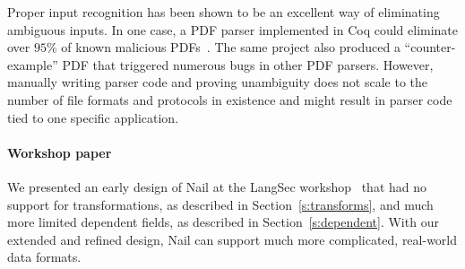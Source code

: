 Proper input recognition has been shown to be an excellent way of eliminating ambiguous inputs. In
one case, a PDF parser implemented in Coq could eliminate over $95\%$ of known malicious
PDFs~\cite{Bogk-PDF}. The same project also produced a ``counter-example'' PDF that triggered
numerous bugs in other PDF parsers. However, manually writing parser code and proving unambiguity
does not scale to the number of file formats and protocols in existence and might result in parser
code tied to one specific application.

\paragraph{Workshop paper}
We presented an early design of Nail at the LangSec workshop~\cite{bangert:nail-langsec} that had
no support for transformations, as described in Section~\ref{s:transforms}, and much more limited
dependent fields, as described in Section~\ref{s:dependent}. With our extended and refined design,
Nail can support much more complicated, real-world data formats.

